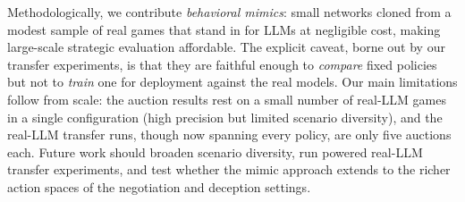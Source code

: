 Methodologically, we contribute \emph{behavioral mimics}: small networks cloned from a modest sample of real games that stand in for LLMs at negligible cost, making large-scale strategic evaluation affordable. The explicit caveat, borne out by our transfer experiments, is that they are faithful enough to \emph{compare} fixed policies but not to \emph{train} one for deployment against the real models. Our main limitations follow from scale: the auction results rest on a small number of real-LLM games in a single configuration (high precision but limited scenario diversity), and the real-LLM transfer runs, though now spanning every policy, are only five auctions each. Future work should broaden scenario diversity, run powered real-LLM transfer experiments, and test whether the mimic approach extends to the richer action spaces of the negotiation and deception settings.
